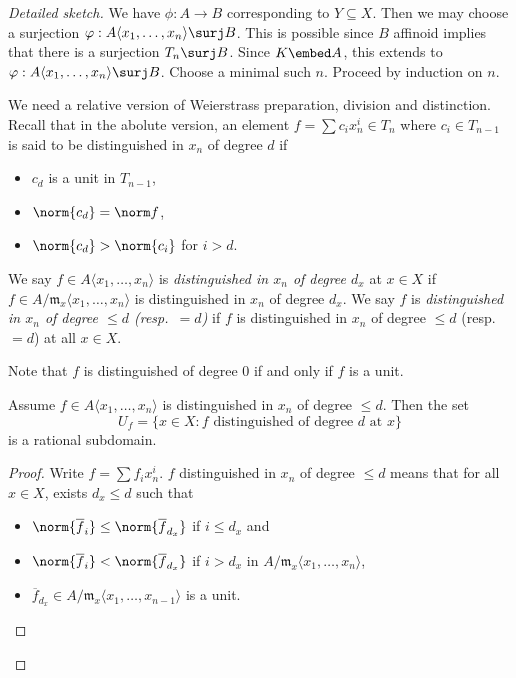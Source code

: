 \documentclass[a4paper]{article}
\begin{document}
\begin{proof}[Detailed sketch]
  We have \(\phi: A \to B\) corresponding to \(Y \subseteq X\). Then we may choose a surjection \(\varphi: A \langle x_1, \dots, x_n\rangle \surj B\). This is possible since \(B\) affinoid implies that there is a surjection \(T_n \surj B\). Since \(K \embed A\), this extends to \(\varphi: A \langle x_1, \dots, x_n \rangle \surj B\). Choose a minimal such \(n\). Proceed by induction on \(n\).

  We need a relative version of Weierstrass preparation, division and distinction. Recall that in the abolute version, an element \(f = \sum c_i x_n^i \in T_n\) where \(c_i \in T_{n - 1}\) is said to be distinguished in \(x_n\) of degree \(d\) if
  \begin{itemize}
  \item \(c_d\) is a unit in \(T_{n - 1}\),
  \item \(\norm{c_d} = \norm f\),
  \item \(\norm{c_d} > \norm{c_i}\) for \(i > d\).
  \end{itemize}

  \begin{definition}
    We say \(f \in A \langle x_1, \dots, x_n \rangle\) is \emph{distinguished in \(x_n\) of degree \(d_x\)} at \(x \in X\) if \(f \in A/\mathfrak m_x \langle x_1, \dots, x_n \rangle\) is distinguished in \(x_n\) of degree \(d_x\). We say \(f\) is \emph{distinguished in \(x_n\) of degree \(\leq d\) (resp.\ \(= d\))} if \(f\) is distinguished in \(x_n\) of degree \(\leq d\) (resp.\ \(= d\)) at all \(x \in X\).
  \end{definition}

  Note that \(f\) is distinguished of degree \(0\) if and only if \(f\) is a unit.

  \begin{lemma}
    Assume \(f \in A \langle x_1, \dots, x_n \rangle\) is distinguished in \(x_n\) of degree \(\leq d\). Then the set
    \[
      U_f = \{x \in X: f \text{ distinguished of degree \(d\) at \(x\)}\}
    \]
    is a rational subdomain.
  \end{lemma}

  \begin{proof}
    Write \(f = \sum f_i x_n^i\). \(f\) distinguished in \(x_n\) of degree \(\leq d\) means that for all \(x \in X\), exists \(d_x \leq d\) such that
    \begin{itemize}
    \item \(\norm{\overline f_i} \leq \norm{\overline f_{d_x}}\) if \(i \leq d_x\) and
    \item \(\norm{\overline f_i} < \norm{\overline f_{d_x}}\) if \(i > d_x\) in \(A/\mathfrak m_x \langle x_1, \dots, x_n \rangle\),
    \item \(\overline f_{d_x} \in A/\mathfrak m_x \langle x_1, \dots, x_{n - 1} \rangle\) is a unit.
    \end{itemize}


\end{proof}
\end{proof}
\end{document}
